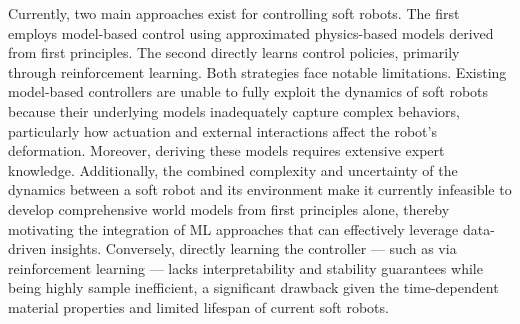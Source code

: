 Currently, two main approaches exist for controlling soft robots. The first employs model-based control using approximated physics-based models derived from first principles. The second directly learns control policies, primarily through reinforcement learning. Both strategies face notable limitations. Existing model-based controllers are unable to fully exploit the dynamics of soft robots because their underlying models inadequately capture complex behaviors, particularly how actuation and external interactions affect the robot’s deformation. Moreover, deriving these models requires extensive expert knowledge. Additionally, the combined complexity and uncertainty of the dynamics between a soft robot and its environment make it currently infeasible to develop comprehensive world models from first principles alone, thereby motivating the integration of \gls{ML} approaches that can effectively leverage data-driven insights. Conversely, directly learning the controller — such as via reinforcement learning — lacks interpretability and stability guarantees while being highly sample inefficient, a significant drawback given the time-dependent material properties and limited lifespan of current soft robots.


